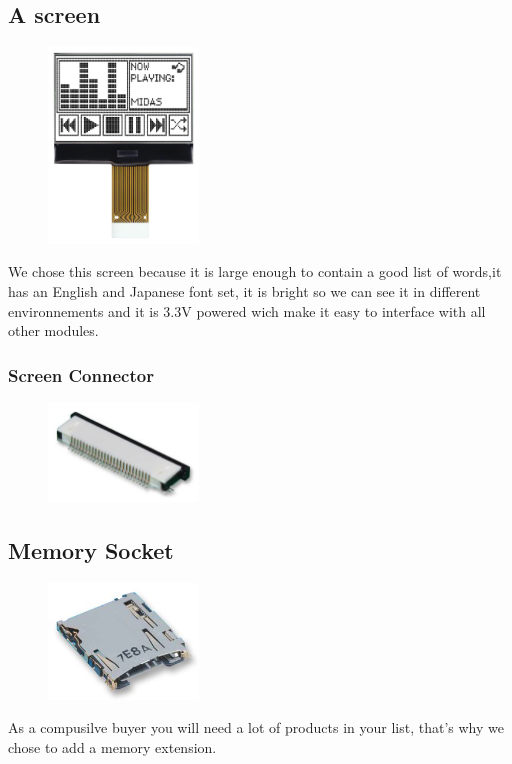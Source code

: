 \documentclass[12pt,a4paper,landscape]{article}
\begin{document}
\begin{multicols}{2}
	\subsection*{A screen}
			\begin{figure}[H]
			\centering
			\includegraphics[width=4cm]{images/screen.png}
			\end{figure}
			We chose this screen because it is large enough to contain a good list of words,it has an English and Japanese font set, it is bright so we can see it in different environnements and it is 3.3V powered wich make it easy to interface with all other modules.

	\subsubsection*{Screen Connector}
			\begin{figure}[H]
			\centering
			\includegraphics[width=4cm]{images/screen_connector.png}
			\end{figure}

	\subsection*{Memory Socket}
			\begin{figure}[H]
			\centering
			\includegraphics[width=4cm]{images/memory_socket.png}
			\end{figure}
			As a compusilve buyer you will need a lot of products in your list, that's why we chose to add a memory extension.


\end{multicols}
\end{document}
